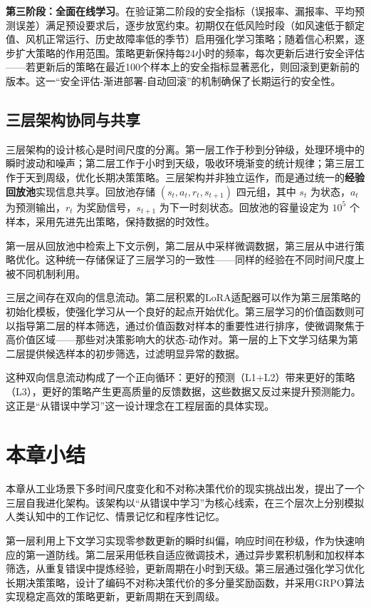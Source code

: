\documentclass[12pt,a4paper]{article}
\begin{document}
\textbf{第三阶段：全面在线学习}。在验证第二阶段的安全指标（误报率、漏报率、平均预测误差）满足预设要求后，逐步放宽约束。初期仅在低风险时段（如风速低于额定值、风机正常运行、历史故障率低的季节）启用强化学习策略；随着信心积累，逐步扩大策略的作用范围。策略更新保持每24小时的频率，每次更新后进行安全评估——若更新后的策略在最近100个样本上的安全指标显著恶化，则回滚到更新前的版本。这一“安全评估-渐进部署-自动回滚”的机制确保了长期运行的安全性。

\subsection{三层架构协同与共享}
三层架构的设计核心是时间尺度的分离。第一层工作于秒到分钟级，处理环境中的瞬时波动和噪声；第二层工作于小时到天级，吸收环境渐变的统计规律；第三层工作于天到周级，优化长期决策策略。三层架构并非独立运作，而是通过统一的\textbf{经验回放池}实现信息共享。回放池存储 $(s_t, a_t, r_t, s_{t+1})$ 四元组，其中 $s_t$ 为状态，$a_t$ 为预测输出，$r_t$ 为奖励信号，$s_{t+1}$ 为下一时刻状态。回放池的容量设定为 $10^5$ 个样本，采用先进先出策略，保持数据的时效性。

第一层从回放池中检索上下文示例，第二层从中采样微调数据，第三层从中进行策略优化。这种统一存储保证了三层学习的一致性——同样的经验在不同时间尺度上被不同机制利用。

三层之间存在双向的信息流动。第二层积累的LoRA适配器可以作为第三层策略的初始化模板，使强化学习从一个良好的起点开始优化。第三层学习的价值函数则可以指导第二层的样本筛选，通过价值函数对样本的重要性进行排序，使微调聚焦于高价值区域——那些对决策影响大的状态-动作对。第一层的上下文学习结果为第二层提供候选样本的初步筛选，过滤明显异常的数据。

这种双向信息流动构成了一个正向循环：更好的预测（L1+L2）带来更好的策略（L3），更好的策略产生更高质量的反馈数据，这些数据又反过来提升预测能力。这正是“从错误中学习”这一设计理念在工程层面的具体实现。


\section{本章小结}

本章从工业场景下多时间尺度变化和不对称决策代价的现实挑战出发，提出了一个三层自我进化架构。该架构以“从错误中学习”为核心线索，在三个层次上分别模拟人类认知中的工作记忆、情景记忆和程序性记忆。

第一层利用上下文学习实现零参数更新的瞬时纠偏，响应时间在秒级，作为快速响应的第一道防线。第二层采用低秩自适应微调技术，通过异步累积机制和加权样本筛选，从重复错误中提炼经验，更新周期在小时到天级。第三层通过强化学习优化长期决策策略，设计了编码不对称决策代价的多分量奖励函数，并采用GRPO算法实现稳定高效的策略更新，更新周期在天到周级。
\end{document}
